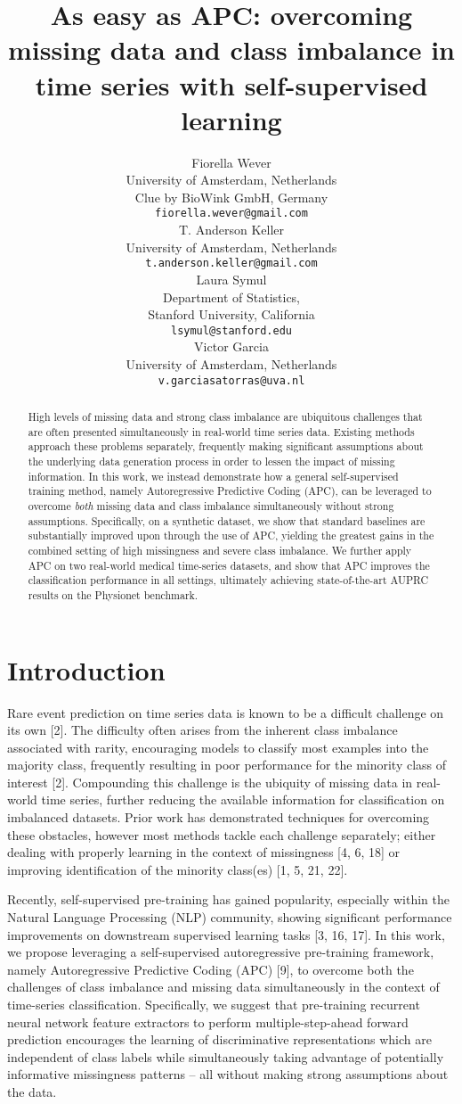 \documentclass{article}
\title{As easy as APC: 
overcoming missing data and class imbalance in time series with self-supervised learning}
\author{
  Fiorella Wever  \\
  University of Amsterdam, Netherlands \\
  Clue by BioWink GmbH, Germany \\
  \texttt{fiorella.wever@gmail.com} \\
\And
  T. Anderson Keller \\
  University of Amsterdam, Netherlands\\
  \texttt{t.anderson.keller@gmail.com} \\
  \And
  Laura Symul\\
  Department of Statistics, \\
  Stanford University, California \\
  \texttt{lsymul@stanford.edu} \\
  \And
  Victor Garcia\\
  University of Amsterdam, Netherlands \\
  \texttt{v.garciasatorras@uva.nl} \\
}
\begin{document}
\maketitle

\begin{abstract}
  High levels of missing data and strong class imbalance are ubiquitous challenges that are often presented simultaneously in real-world time series data. 
  Existing methods approach these problems separately, frequently making significant  assumptions about the underlying data generation process in order to lessen the impact of missing information. In this work, we instead demonstrate how a general self-supervised training method, namely Autoregressive Predictive Coding (APC), can be leveraged to overcome \textit{both} missing data and class imbalance simultaneously without strong assumptions. 
  Specifically, on a synthetic dataset, we show that standard baselines are substantially improved upon through the use of APC, yielding the greatest gains in the combined setting of high missingness and severe class imbalance. 
  We further apply APC on two real-world medical time-series datasets, and show that APC improves the classification performance in all settings, ultimately achieving state-of-the-art AUPRC results on the Physionet benchmark.  
\end{abstract}

\section{Introduction}
Rare event prediction on time series data is known to be a difficult challenge on its own  [2]. The difficulty often arises from the inherent class imbalance associated with rarity, encouraging models to classify most examples into the majority class, frequently resulting in poor performance for the minority class of interest [2].
Compounding this challenge is the ubiquity of missing data in real-world time series, further reducing the available information for classification on imbalanced datasets.
Prior work has demonstrated techniques for overcoming these obstacles, 
however most methods tackle each challenge separately; either dealing with properly learning in the context of missingness [4, 6, 18]
or improving identification of the minority class(es) [1, 5, 21, 22].


Recently, self-supervised pre-training has gained popularity, especially within the Natural Language Processing (NLP) community, showing significant performance improvements on downstream supervised learning tasks [3, 16, 17]. 
In this work, we propose leveraging a self-supervised autoregressive pre-training framework, namely Autoregressive Predictive Coding (APC) [9], to overcome both the challenges of class imbalance and missing data simultaneously in the context of time-series classification. 
Specifically, we suggest that pre-training recurrent neural network feature extractors to perform multiple-step-ahead forward prediction encourages the learning of discriminative representations which are independent of class labels while simultaneously taking advantage of potentially informative missingness patterns -- all without making strong assumptions about the data. 
\end{document}
